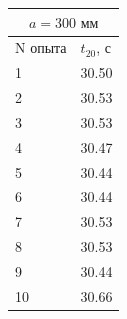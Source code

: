 \documentclass[a4paper]{article}
\begin{document}
\begin{itemize}
\begin{table}
\begin{minipage}{0.32\linewidth}
\begin{tabular}{|l|l|}
\hline       
\end{tabular}
\caption{}
\end{minipage}
\begin{minipage}{0.32\linewidth}
\centering
\begin{tabular}{|l|l|}
\hline
\multicolumn{2}{|c|}{$a = 300 \text{ мм}$} \\
\hline
N опыта & $t_{20}$, с  \\
\hline
1       &   30.50          \\
\hline
2       &   30.53             \\
\hline
3       &   30.53            \\
\hline
4       &   30.47           \\
\hline
5       &   30.44           \\
\hline
6       &   30.44            \\
\hline
7       &   30.53           \\
\hline
8       &   30.53             \\
\hline
9       &   30.44             \\
\hline
10      &   30.66    \\
\hline       
\end{tabular}
\caption{}
\end{minipage}
\end{table}


\end{itemize}
\end{document}
